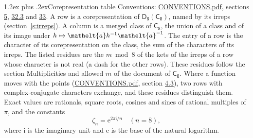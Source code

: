 \documentclass[10pt,a4paper]{article}
\makeatletter
\renewcommand\section{\@startsection{section}{1}{\z@}{-3ex plus -1ex minus -.2ex}%
  {1.2ex plus .2ex}{\normalfont\large\sffamily\bfseries\color{parttitle}}}
\numberwithin{equation}{section}
\newcommand{\eltfont}[1]{{\let\sigma\eltsigma\mathelt{#1}}}
\newcommand{\grp}[1]{\mathsf{#1}}
\newcommand{\elt}[1]{\eltfont{#1}}
\newcommand{\iunit}{\mathrm{i}}
\newcommand{\expe}{\mathrm{e}}
\newcommand{\rootunity}[1]{\zeta_{#1}}
\makeatother
\begin{document}
\section{Corepresentation table}\label{s:character_table}
Conventions: \href{../../CONVENTIONS.pdf}{CONVENTIONS.pdf}, sections \href{../../../rotation/CONVENTIONS.pdf\#conv.5}{5}, \href{../../CONVENTIONS.pdf\#conv.32.3}{32.3} and \href{../../CONVENTIONS.pdf\#conv.33}{33}.
A row is a corepresentation of $\grp{D_{8}}(\grp{C_{8}})$, named by its irreps (section~\ref{s:irreps}). A column is a merged class of $\grp{C_{8}}$, the union of a class and of its image under $h \mapsto \elt{a} h^{-1} \elt{a}^{-1}$. The entry of a row is the character of its corepresentation on the class, the sum of the characters of its irreps.
\leavevmode\label{n:head.parity}The listed residues are the $m \bmod 8$ of the kets of the irreps of a row whose character is not real (a dash for the other rows). These residues follow the section Multiplicities and allowed $m$ of the document of \href{../../../rotation/data/pdf/C8.pdf}{$\grp{C_{8}}$}. Where a function moves with the points (\href{../../CONVENTIONS.pdf}{CONVENTIONS.pdf}, section \href{../../../rotation/CONVENTIONS.pdf\#conv.4.3}{4.3}), two rows with complex-conjugate characters exchange, and these residues distinguish them.
\leavevmode\label{n:constant.root}\label{n:index.root.order}Exact values are rationals, square roots, cosines and sines of rational multiples of $\pi$, and the constants
\begin{equation}\label{e:constants}\rootunity{n} = \expe^{2\pi\iunit/n}\quad(n = 8),\end{equation}
where $\iunit$ is the imaginary unit and $\expe$ is the base of the natural logarithm.
\end{document}
